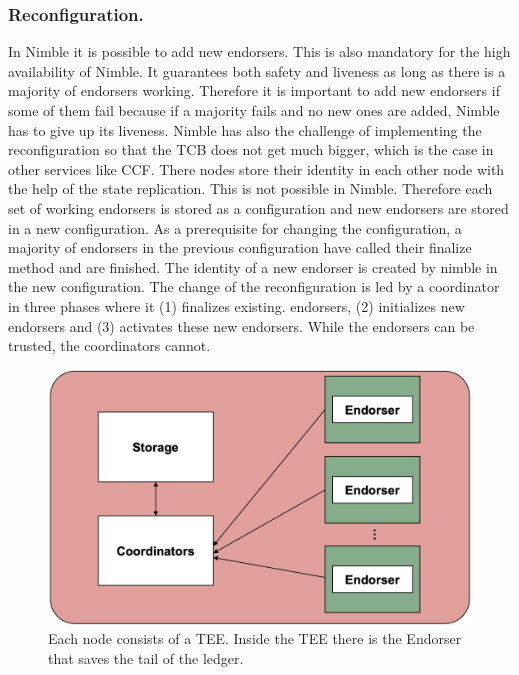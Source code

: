	\subsubsection*{Reconfiguration.}
	In Nimble it is possible to add new endorsers. This is also mandatory for the high availability of Nimble. It guarantees both safety and liveness as long as there is a majority of endorsers working. Therefore it is important to add new endorsers if some of them fail because if a majority fails and no new ones are added, Nimble has to give up its liveness. Nimble has also the challenge of implementing the reconfiguration so that the TCB does not get much bigger, which is the case in other services like CCF. There nodes store their identity in each other node with the help of the state replication. This is not possible in Nimble. Therefore each set of working endorsers is stored as a configuration and new endorsers are stored in a new configuration. As a prerequisite for changing the configuration, a majority of endorsers in the previous configuration have called their finalize method and are finished. The identity of a new endorser is created by nimble in the new configuration. The change of the reconfiguration is led by a coordinator in three phases where it (1) finalizes existing. endorsers, (2) initializes new endorsers and (3) activates these new endorsers. While the endorsers can be trusted, the coordinators cannot. 
	
\begin{figure}[b]
	\includegraphics[scale=0.14]{pictures/nimble}
	\caption{Each node consists of a TEE. Inside the TEE there is the Endorser that saves the tail of the ledger.}
	\label{nimble}
\end{figure}
